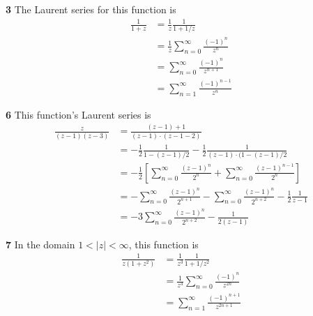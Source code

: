 \documentclass{article}
\begin{document}
\textbf{3}
The Laurent series for this function is
\begin{align*}
	\frac{1}{1 + z}
	&= \frac{1}{z} \frac{1}{1 + 1/z} \\
	&= \frac{1}{z} \sum_{n=0}^\infty \frac{(-1)^n}{z^n} \\
	&= \sum_{n=0}^\infty \frac{(-1)^n}{z^{n+1}} \\
	&= \sum_{n=1}^\infty \frac{(-1)^{n-1}}{z^n}
\end{align*}

\textbf{6}
This function's Laurent series is
\begin{align*}
	\frac{z}{(z-1)(z-3)}
	&= \frac{(z-1) + 1}{(z-1) \cdot (z-1 - 2)} \\
	&= -\frac{1}{2} \frac{1}{1 - (z-1)/2} - \frac{1}{2} \frac{1}{(z-1) \cdot (1 - (z-1)/2} \\
	&= -\frac{1}{2} \left[ \sum_{n=0}^\infty \frac{(z-1)^n}{2^n} + \sum_{n=0}^\infty \frac{(z-1)^{n-1}}{2^n} \right] \\
	&= - \sum_{n=0}^\infty \frac{(z-1)^n}{2^{n+1}} - \sum_{n=0}^\infty \frac{(z-1)^n}{2^{n+2}} - \frac{1}{2} \frac{1}{z-1} \\
	&= -3 \sum_{n=0}^\infty \frac{(z-1)^n}{2^{n+2}} - \frac{1}{2(z-1)}
\end{align*}

\textbf{7}
In the domain $1 < |z| < \infty$, this function is
\begin{align*}
	\frac{1}{z(1 + z^2)}
	&= \frac{1}{z^3} \frac{1}{1 + 1/z^2} \\
	&= \frac{1}{z^3} \sum_{n=0}^\infty \frac{(-1)^n}{z^{2n}} \\
	&= \sum_{n=1}^\infty \frac{(-1)^{n+1}}{z^{2n+1}}
\end{align*}
\end{document}

